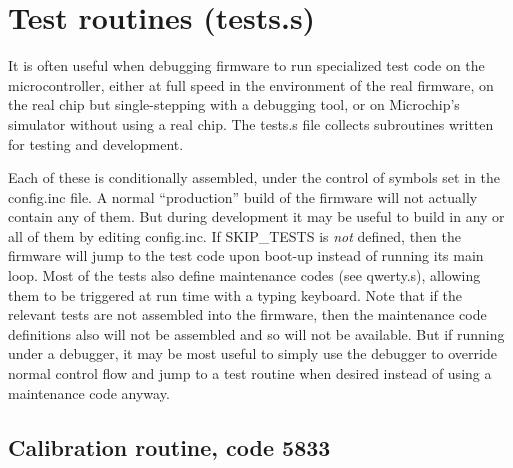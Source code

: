 
%
%
%
%
%
%

\chapter{Test routines (tests.s)}

It is often useful when debugging firmware to run specialized test code on the
microcontroller, either at full speed in the environment of the real
firmware, on the real chip but single-stepping with a debugging tool, or
on Microchip's simulator without using a real chip.  The tests.s file
collects subroutines written for testing and development.

Each of these is conditionally assembled, under the control of symbols set
in the config.inc file.  A normal ``production'' build of the firmware will
not actually contain any of them.  But during development it may be useful
to build in any or all of them by editing config.inc.  If SKIP\_TESTS is
\emph{not} defined, then the firmware will jump to the test code upon
boot-up instead of running its main loop.  Most of the tests also define
maintenance codes (see qwerty.s), allowing them to be triggered at run time
with a typing keyboard.  Note that if the relevant tests are not assembled
into the firmware, then the maintenance code definitions also will not be
assembled and so will not be available.  But if running under a debugger, it
may be most useful to simply use the debugger to override normal control
flow and jump to a test routine when desired instead of using a maintenance
code anyway.

\section{Calibration routine, code 5833}

